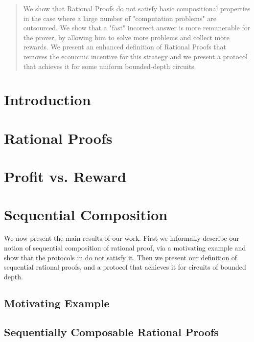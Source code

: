\begin{abstract}
We show that Rational Proofs  do not satisfy basic compositional properties in the case where a large number of "computation problems" are outsourced. We show that a "fast" incorrect answer is more remunerable for the prover, by allowing him to solve more problems and collect more rewards.
We present an enhanced definition of Rational Proofs that removes the economic incentive  for this strategy and we present a protocol that achieves it for
some
uniform bounded-depth circuits.
\end{abstract}

%

\section{Introduction}


\section{Rational Proofs}


\section{Profit vs. Reward}


\section{Sequential Composition}
We now present the main results of our work. First we informally describe our notion of sequential composition of 
rational proof, via a motivating example and show that the protocols in \cite{am,am1,rosen} do not satisfy it. Then we present our definition of sequential rational proofs, and a protocol that achieves it for circuits of bounded depth. 


\subsection{Motivating Example}


\subsection{Sequentially Composable Rational Proofs}


